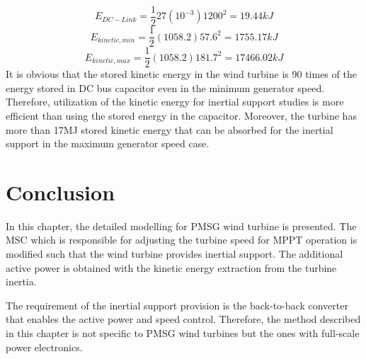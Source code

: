 \begin{equation}
E_{DC-Link}=\frac{1}{2} 27 (10^{-3}) 1200^{2}=19.44kJ
\label{electrostatic2}
\end{equation}
\begin{equation}
E_{kinetic,min}=\frac{1}{2} (1058.2) 57.6^{2}=1755.17kJ
\label{kineticenergymin}
\end{equation}
\begin{equation}
E_{kinetic,max}=\frac{1}{2} (1058.2) 181.7^{2}=17466.02kJ
\label{kineticenergymax}
\end{equation}
It is obvious that the stored kinetic energy in the wind turbine is 90 times of the energy stored in DC bus capacitor even in the minimum generator speed. Therefore, utilization of the kinetic energy for inertial support studies is more efficient than using the stored energy in the capacitor. Moreover, the turbine has more than 17MJ stored kinetic energy that can be absorbed for the inertial support in the maximum generator speed case.
\section{Conclusion}
In this chapter, the detailed modelling for PMSG wind turbine is presented. The MSC which is responsible for adjusting the turbine speed for MPPT operation is modified such that the wind turbine provides inertial support. The additional active power is obtained with the kinetic energy extraction from the turbine inertia. \par
The requirement of the inertial support provision is the back-to-back converter that enables the active power and speed control. Therefore, the method described in this chapter is not specific to PMSG wind turbines but the ones with full-scale power electronics. 